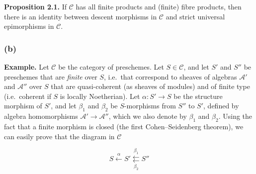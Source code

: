\documentclass{article}
\newenvironment{rmenv}[1]
  {\phantomsection\par\smallskip\noindent\textbf{#1.}\rmfamily}
  {\par\smallskip}
\theoremstyle{definition}
\theoremstyle{definition}
\theoremstyle{definition}
\theoremstyle{definition}
\theoremstyle{remark}
\begin{document}
\leavevmode{}%
\begin{rmenv}{Proposition 2.1}
If \({\mathcal{C}}\) has all finite products and (finite) fibre products, then there is an identity between descent morphisms in \({\mathcal{C}}\) and strict universal epimorphisms in \({\mathcal{C}}\).

\end{rmenv}

\hypertarget{fga-3-i-section-A.2.b}{%
\subsubsection{(b)}\label{fga-3-i-section-A.2.b}}

\begin{rmenv}{Example}
Let \({\mathcal{C}}\) be the category of preschemes.
Let \(S\in{\mathcal{C}}\), and let \(S'\) and \(S''\) be preschemes that are \emph{finite} over \(S\), i.e.~that correspond to sheaves of algebras \({\mathscr{A}}'\) and \({\mathscr{A}}''\) over \(S\) that are quasi-coherent (as sheaves of modules) and of finite type (i.e.~coherent if \(S\) is locally Noetherian).
Let \(\alpha\colon S'\to S\) be the structure morphism of \(S'\), and let \(\beta_1\) and \(\beta_2\) be \(S\)-morphisms from \(S''\) to \(S'\), defined by algebra homomorphisms \({\mathscr{A}}'\to{\mathscr{A}}''\), which we also denote by \(\beta_1\) and \(\beta_2\).
Using the fact that a finite morphism is closed (the first Cohen--Seidenberg theorem), we can easily prove that the diagram in \({\mathcal{C}}\)

\leavevmode{}%
\[
  S \xleftarrow{\alpha}
  S' \overset{\beta_1}{\underset{\beta_2}{\leftleftarrows}}
  S''
\tag{+}
\]


\end{rmenv}
\end{document}
